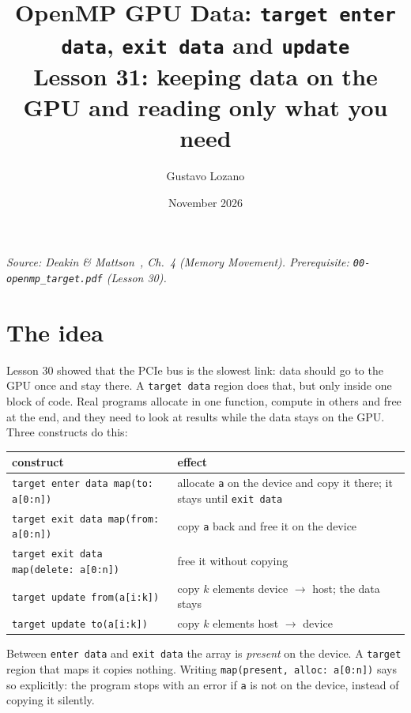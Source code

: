 \documentclass[11pt,a4paper]{article}
\title{\textbf{OpenMP GPU Data: \texttt{target enter data}, \texttt{exit data} and \texttt{update}}\\[4pt]\large Lesson 31: keeping data on the GPU and reading only what you need}
\author{Gustavo Lozano}
\date{November 2026}
\let\origtexttt\texttt
\renewcommand{\texttt}[1]{\textcolor{black!60}{\origtexttt{#1}}}
\begin{document}
\maketitle

\noindent\textit{\small Source: Deakin \& Mattson~\cite{dm}, Ch.~4 (Memory Movement).
Prerequisite: \texttt{00-openmp\_target.pdf} (Lesson 30).}

\section{The idea}
Lesson 30 showed that the PCIe bus is the slowest link: data should go to the GPU once and stay
there. A \texttt{target data} region does that, but only inside one block of code. Real
programs allocate in one function, compute in others and free at the end, and they need to
look at results while the data stays on the GPU. Three constructs do this:

\begin{center}
\small
\begin{tabular}{@{}lp{8.9cm}@{}}
\toprule
construct & effect \\ \midrule
\texttt{target enter data map(to: a[0:n])} & allocate \texttt{a} on the device and copy it
there; it stays until \texttt{exit data} \\
\texttt{target exit data map(from: a[0:n])} & copy \texttt{a} back and free it on the device \\
\texttt{target exit data map(delete: a[0:n])} & free it without copying \\
\texttt{target update from(a[i:k])} & copy $k$ elements device $\rightarrow$ host; the data
stays \\
\texttt{target update to(a[i:k])} & copy $k$ elements host $\rightarrow$ device \\
\bottomrule
\end{tabular}
\end{center}

Between \texttt{enter data} and \texttt{exit data} the array is \emph{present} on the device.
A \texttt{target} region that maps it copies nothing. Writing
\texttt{map(present, alloc: a[0:n])} says so explicitly: the program stops with an error if
\texttt{a} is not on the device, instead of copying it silently.
\end{document}
